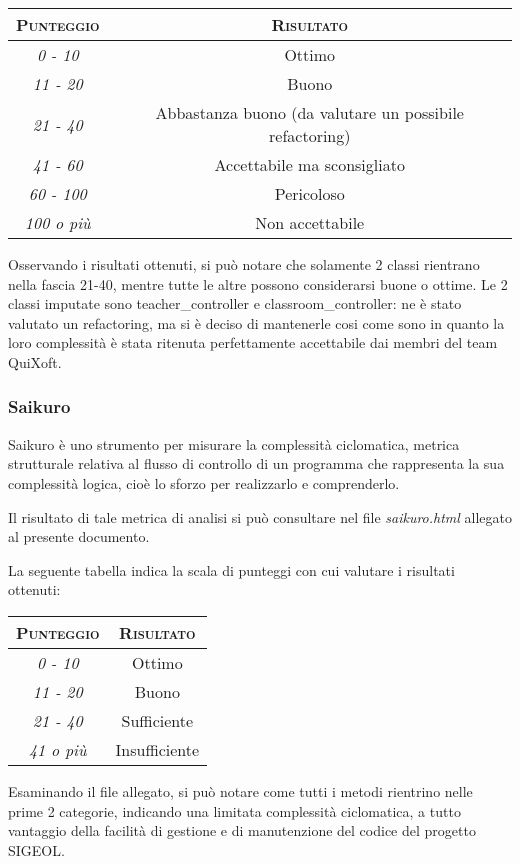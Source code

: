 \documentclass[11pt,a4paper]{article}
\begin{document}
\begin{center}
\begin{tabular}{|c|c|}
\hline
\textsc{Punteggio} & \textsc{Risultato} \\
\hline
\hline
\textit{0 - 10} & Ottimo  \\
\hline
\textit{11 - 20} & Buono  \\
\hline
\textit{21 - 40} & Abbastanza buono (da valutare un possibile refactoring)  \\
\hline
\textit{41 - 60} & Accettabile ma sconsigliato  \\
\hline
\textit{60 - 100} & Pericoloso  \\
\hline
\textit{100 o più} & Non accettabile  \\
\hline
\end{tabular}
\end{center}
Osservando i risultati ottenuti, si può notare che solamente 2 classi rientrano nella fascia 21-40, mentre tutte le altre possono considerarsi buone o ottime. Le 2 classi imputate sono teacher\_controller e classroom\_controller: ne è stato valutato un refactoring, ma si è deciso di mantenerle cosi come sono in quanto la loro complessità è stata ritenuta perfettamente accettabile dai membri del team QuiXoft.
\subsubsection{Saikuro}
Saikuro è uno strumento per misurare la complessità ciclomatica, metrica strutturale relativa al flusso di controllo di un programma che rappresenta la sua complessità logica, cioè lo sforzo per realizzarlo e comprenderlo.

Il risultato di tale metrica di analisi si può consultare nel file \textit{saikuro.html} allegato al presente documento.

La seguente tabella indica la scala di punteggi con cui valutare i risultati ottenuti:
\begin{center}
\begin{tabular}{|c|c|}
\hline
\textsc{Punteggio} & \textsc{Risultato} \\
\hline
\hline
\textit{0 - 10} & Ottimo  \\
\hline
\textit{11 - 20} & Buono  \\
\hline
\textit{21 - 40} & Sufficiente  \\
\hline
\textit{41 o più} & Insufficiente  \\
\hline
\end{tabular}
\end{center}
Esaminando il file allegato, si può notare come tutti i metodi rientrino nelle prime 2 categorie, indicando una limitata complessità ciclomatica, a tutto vantaggio della facilità di gestione e di manutenzione del codice del progetto SIGEOL.
\end{document}
